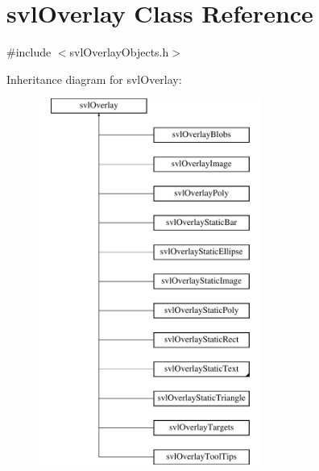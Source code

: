 \hypertarget{classsvl_overlay}{\section{svl\-Overlay Class Reference}
\label{classsvl_overlay}
}


{\ttfamily \#include $<$svl\-Overlay\-Objects.\-h$>$}

Inheritance diagram for svl\-Overlay\-:\begin{figure}[H]
\begin{center}
\leavevmode
\includegraphics[height=12.000000cm]{dc/d84/classsvl_overlay}
\end{center}
\end{figure}

